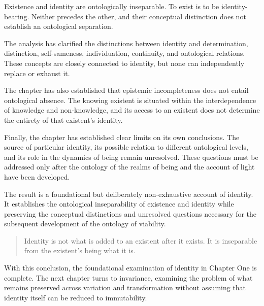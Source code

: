 Existence and identity are ontologically inseparable. To exist is to be identity-bearing. Neither precedes the other, and their conceptual distinction does not establish an ontological separation.

The analysis has clarified the distinctions between identity and determination, distinction, self-sameness, individuation, continuity, and ontological relations. These concepts are closely connected to identity, but none can independently replace or exhaust it.

The chapter has also established that epistemic incompleteness does not entail ontological absence. The knowing existent is situated within the interdependence of knowledge and non-knowledge, and its access to an existent does not determine the entirety of that existent's identity.

Finally, the chapter has established clear limits on its own conclusions. The source of particular identity, its possible relation to different ontological levels, and its role in the dynamics of being remain unresolved. These questions must be addressed only after the ontology of the realms of being and the account of light have been developed.

The result is a foundational but deliberately non-exhaustive account of identity. It establishes the ontological inseparability of existence and identity while preserving the conceptual distinctions and unresolved questions necessary for the subsequent development of the ontology of viability.

\begin{quote}
Identity is not what is added to an existent after it exists. It is inseparable from the existent's being what it is.
\end{quote}

With this conclusion, the foundational examination of identity in Chapter One is complete. The next chapter turns to invariance, examining the problem of what remains preserved across variation and transformation without assuming that identity itself can be reduced to immutability.

